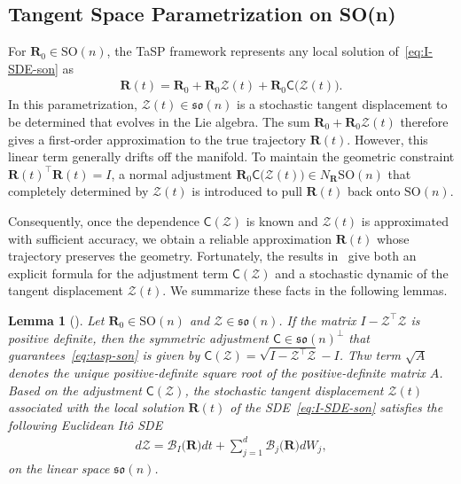 \documentclass[11pt, a4paper, onecolumn]{article}
\newcommand{\SOn}{\mathrm{SO}(n)}
\newcommand{\son}{\mathfrak{so}(n)}
\newcommand{\sonp}{\mathfrak{so}(n)^{\perp}}
\newcommand{\bfR}{\mathbf{R}}
\renewcommand{\bf}[1]{\mathbf{#1}}
\newtheorem{lemma}{Lemma}
\begin{document}
\subsection{Tangent Space Parametrization on SO(n)}
For $\mathbf R_0\in\SOn$, the TaSP framework represents any local solution of~\cref{eq:I-SDE-son} as
\begin{align}\label{eq:tasp-son}
    \mathbf R(t) =\mathbf R_0 +\mathbf R_0 \mathcal Z(t) +\mathbf R_0 \mathsf C\bigl(\mathcal Z(t)\bigr).
\end{align}
In this parametrization, $\mathcal Z(t)\in\son$ is a stochastic tangent displacement to be determined that evolves in the Lie algebra.  The sum $\mathbf R_0+\mathbf R_0\mathcal Z(t)$ therefore gives a first‑order approximation to the true trajectory $\mathbf R(t)$. However, this linear term generally drifts off the manifold.  To maintain the geometric constraint $\mathbf R(t)^{\top}\mathbf R(t)=I$, a normal adjustment $\mathbf R_0 \mathsf C\bigl(\mathcal Z(t)\bigr) \in N_{\bfR}\SOn$ that completely determined by $\mathcal Z(t)$ is introduced to pull $\bf R(t)$ back onto $\SOn$.

Consequently, once the dependence $\mathsf C(\mathcal Z)$ is known and $\mathcal Z(t)$ is approximated with sufficient accuracy, we obtain a reliable approximation $\mathbf R(t)$ whose trajectory preserves the geometry. Fortunately, the results in~\cite{wang2025tangent} give both an explicit formula for the adjustment term $\mathsf C(\mathcal Z)$ and a stochastic dynamic of the tangent displacement $\mathcal Z(t)$.  We summarize these facts in the following lemmas.

\begin{lemma}[\cite{wang2025tangent}]\label{lemma:correction}
Let $\bfR_0\in\SOn$ and $\mathcal Z\in\son$.  If the matrix $I-\mathcal Z^{\top}\mathcal Z$ is positive definite, then the symmetric adjustment $\mathsf C\in\sonp$ that guarantees~\cref{eq:tasp-son} is given by $\mathsf C(\mathcal Z)=\sqrt{ I-\mathcal Z^{\top}\mathcal Z}-I$. Thw term $\sqrt{A}$ denotes the unique positive‑definite square root of the positive‑definite matrix $A$. Based on the adjustment $\mathsf C(\mathcal Z)$, the stochastic tangent displacement $\mathcal Z(t)$ associated with the local solution $\mathbf R(t)$ of the SDE~\cref{eq:I-SDE-son} satisfies the following Euclidean It\^o SDE
\begin{align}\label{eq:sde-z}
   d\mathcal Z =\mathcal B_I\bigl(\mathbf R\bigr) dt +\sum_{j=1}^{d}\mathcal B_j\bigl(\mathbf R\bigr)dW_j, 
\end{align}
on the linear space $\son$.
\end{lemma}
\end{document}
